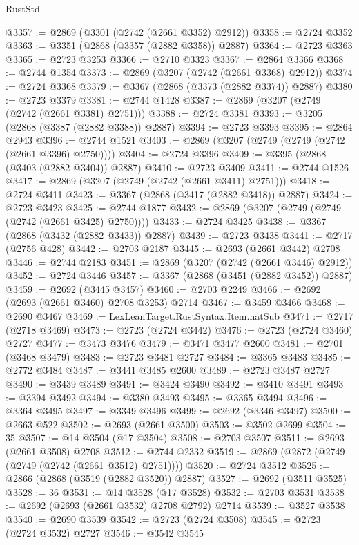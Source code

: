 \begin{lexlean}{RustStd}
\begin{coremodule}
@3357 := @2869 (@3301 (@2742 (@2661 @3352) @2912))
@3358 := @2724 @3352
@3363 := @3351 (@2868 (@3357 (@2882 @3358)) @2887)
@3364 := @2723 @3363
@3365 := @2723 @3253
@3366 := @2710 @3323
@3367 := @2864 @3366
@3368 := @2744 @1354
@3373 := @2869 (@3207 (@2742 (@2661 @3368) @2912))
@3374 := @2724 @3368
@3379 := @3367 (@2868 (@3373 (@2882 @3374)) @2887)
@3380 := @2723 @3379
@3381 := @2744 @1428
@3387 := @2869 (@3207 (@2749 (@2742 (@2661 @3381) @2751)))
@3388 := @2724 @3381
@3393 := @3205 (@2868 (@3387 (@2882 @3388)) @2887)
@3394 := @2723 @3393
@3395 := @2864 @2943
@3396 := @2744 @1521
@3403 := @2869 (@3207 (@2749 (@2749 (@2742 (@2661 @3396) @2750))))
@3404 := @2724 @3396
@3409 := @3395 (@2868 (@3403 (@2882 @3404)) @2887)
@3410 := @2723 @3409
@3411 := @2744 @1526
@3417 := @2869 (@3207 (@2749 (@2742 (@2661 @3411) @2751)))
@3418 := @2724 @3411
@3423 := @3367 (@2868 (@3417 (@2882 @3418)) @2887)
@3424 := @2723 @3423
@3425 := @2744 @1877
@3432 := @2869 (@3207 (@2749 (@2749 (@2742 (@2661 @3425) @2750))))
@3433 := @2724 @3425
@3438 := @3367 (@2868 (@3432 (@2882 @3433)) @2887)
@3439 := @2723 @3438
@3441 := @2717 (@2756 @428)
@3442 := @2703 @2187
@3445 := @2693 (@2661 @3442) @2708
@3446 := @2744 @2183
@3451 := @2869 (@3207 (@2742 (@2661 @3446) @2912))
@3452 := @2724 @3446
@3457 := @3367 (@2868 (@3451 (@2882 @3452)) @2887)
@3459 := @2692 (@3445 @3457)
@3460 := @2703 @2249
@3466 := @2692 (@2693 (@2661 @3460) @2708 @3253) @2714
@3467 := @3459 @3466
@3468 := @2690 @3467
@3469 := LexLeanTarget.RustSyntax.Item.natSub
@3471 := @2717 (@2718 @3469)
@3473 := @2723 (@2724 @3442)
@3476 := @2723 (@2724 @3460) @2727
@3477 := @3473 @3476
@3479 := @3471 @3477 @2600
@3481 := @2701 (@3468 @3479)
@3483 := @2723 @3481 @2727
@3484 := @3365 @3483
@3485 := @2772 @3484
@3487 := @3441 @3485 @2600
@3489 := @2723 @3487 @2727
@3490 := @3439 @3489
@3491 := @3424 @3490
@3492 := @3410 @3491
@3493 := @3394 @3492
@3494 := @3380 @3493
@3495 := @3365 @3494
@3496 := @3364 @3495
@3497 := @3349 @3496
@3499 := @2692 (@3346 @3497)
@3500 := @2663 @522
@3502 := @2693 (@2661 @3500)
@3503 := @3502 @2699
@3504 := 35
@3507 := @14 @3504 (@17 @3504)
@3508 := @2703 @3507
@3511 := @2693 (@2661 @3508) @2708
@3512 := @2744 @2332
@3519 := @2869 (@2872 (@2749 (@2749 (@2742 (@2661 @3512) @2751))))
@3520 := @2724 @3512
@3525 := @2866 (@2868 (@3519 (@2882 @3520)) @2887)
@3527 := @2692 (@3511 @3525)
@3528 := 36
@3531 := @14 @3528 (@17 @3528)
@3532 := @2703 @3531
@3538 := @2692 (@2693 (@2661 @3532) @2708 @2792) @2714
@3539 := @3527 @3538
@3540 := @2690 @3539
@3542 := @2723 (@2724 @3508)
@3545 := @2723 (@2724 @3532) @2727
@3546 := @3542 @3545

\end{coremodule}
\end{lexlean}
